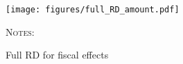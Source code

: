 \documentclass[12pt,a4paper]{article}
\begin{document}
\begin{comment}
\begin{figure}[H]
\begin{adjustwidth}{-1in}{-1in}	
\caption{Amounts by age and SRA cohort, for different source of income}
\label{DD_plot_amount}
\centering
\texttt{[image: figures/evo\_workstate\_amount.pdf]}
\end{adjustwidth}
\begin{minipage}{15cm}%
\footnotesize
	\textsc{Notes:} 
\end{minipage}%
\end{figure}
\end{comment}



\begin{figure}[H]
\begin{adjustwidth}{-1in}{-1in}	
\caption{Full RD for fiscal effects}
\label{full_RD_amount}
\centering
\texttt{[image: figures/full\_RD\_amount.pdf]}
\end{adjustwidth}
\begin{minipage}{15cm}%
	\textsc{Notes:} 
\end{minipage}%
\end{figure}




\begin{comment}
\begin{figure}[H]
\begin{adjustwidth}{-1in}{-1in}	
\caption{Full RD for substitution effect: employed at 60}
\label{full_RD_substitution60}
\centering
\texttt{[image: figures/full\_RD\_substitution\_60.pdf]}
\end{adjustwidth}
\begin{minipage}{15cm}%
	\textsc{Notes:} 
\end{minipage}%
\end{figure}

\begin{figure}[H]
\begin{adjustwidth}{-1in}{-1in}	
\caption{Full RD for substitution effect: employed at 65}
\label{full_RD_substitution65}
\centering
\texttt{[image: figures/full\_RD\_substitution\_64.pdf]}
\end{adjustwidth}
\begin{minipage}{15cm}%
	\textsc{Notes:} 
\end{minipage}%
\end{figure}
\end{comment}
\end{document}
